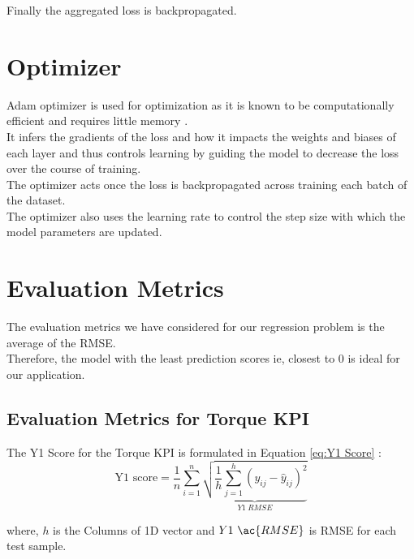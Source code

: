 \documentclass{report} %
\begin{document}
Finally the aggregated loss is backpropagated.\\
\vspace{0.2cm} %

\section{Optimizer}\label{sec:Optimizer}

Adam optimizer is used for optimization as it is known to be computationally efficient and requires little memory \cite{ADAM-2017}. \\
It infers the gradients of the loss and how it impacts the weights and biases of each layer and thus controls learning by guiding the model to decrease the loss over the course of training. \\
The optimizer acts once the loss is backpropagated across training each batch of the dataset.\\
The optimizer also uses the learning rate to control the step size with which the model parameters are updated.\\

\section{Evaluation Metrics}

The evaluation metrics we have considered for our regression problem is the average of the \ac{RMSE}. \\
Therefore, the model with the least prediction scores ie, closest to 0 is ideal for our application. \\

\subsection{Evaluation Metrics for Torque \ac{KPI}}\label{sec:Evaluation Metrics for 2D KPI}

The Y1 Score for the Torque \ac{KPI} is formulated in Equation \ref{eq:Y1 Score} :
\begin{equation}
\text{Y1 score} = \frac{1}{n} \sum_{i=1}^{n} \underbrace{ \sqrt{\frac{1}{h} \sum_{j=1}^{h} (y_{ij} - \hat{y}_{ij})^2}}_{Y1\ RMSE}
\label{eq:Y1 Score}
\end{equation}

where, \(h\) is the Columns of 1D vector and \(Y1\ \ac{RMSE}\) is \ac{RMSE} for each test sample.
\end{document}
